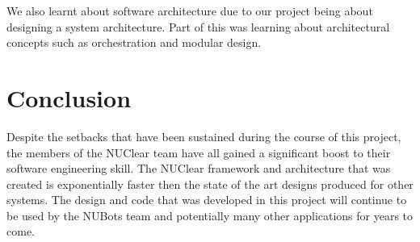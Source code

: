 \documentclass[english,12pt]{scrartcl}
\begin{document}
		We also learnt about software architecture due to our project being about designing a system architecture.
		Part of this was learning about architectural concepts such as orchestration and modular design.
		
\section{Conclusion}
	Despite the setbacks that have been sustained during the course of this project, the members of the NUClear team have all gained a significant boost to their software engineering skill.
	The NUClear framework and architecture that was created is exponentially faster then the state of the art designs produced for other systems.
	The design and code that was developed in this project will continue to be used by the NUBots team and potentially many other applications for years to come.
	
\end{document}
